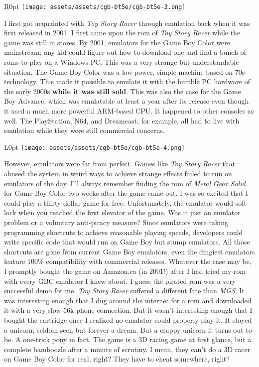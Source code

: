 \documentclass{book}
\begin{document}
\begin{wrapfigure}{R}{0pt} \texttt{[image: assets/assets/cgb-bt5e/cgb-bt5e-3.png]}\end{wrapfigure}
I first got acquainted with \emph{Toy Story Racer} through emulation back when it was first released in 2001. I first came upon the rom of \emph{Toy Story Racer} while the game was still in stores. By 2001, emulators for the Game Boy Color were mainstream; any kid could figure out how to download one and find a bunch of roms to play on a Windows PC. This was a very strange but understandable situation. The Game Boy Color was a low-power, simple machine based on 70s technology. This made it possible to emulate it with the humble PC hardware of the early 2000s \textbf{while it was still sold}. This was also the case for the Game Boy Advance, which was emulatable at least a year after its release even though it used a much more powerful ARM-based CPU. It happened to other consoles as well. The PlayStation, N64, and Dreamcast, for example, all had to live with emulation while they were still commercial concerns.

\begin{wrapfigure}{L}{0pt} \texttt{[image: assets/assets/cgb-bt5e/cgb-bt5e-4.png]}\end{wrapfigure}
However, emulators were far from perfect. Games like \emph{Toy Story Racer} that abused the system in weird ways to achieve strange effects failed to run on emulators of the day. I’ll always remember finding the rom of \emph{Metal Gear Solid} for Game Boy Color two weeks after the game came out. I was so excited that I could play a thirty-dollar game for free. Unfortunately, the emulator would soft-lock when you reached the first elevator of the game. Was it just an emulator problem or a voluntary anti-piracy measure? Since emulators were taking programming shortcuts to achieve reasonable playing speeds, developers could write specific code that would run on Game Boy but stump emulators. All those shortcuts are gone from current Game Boy emulators; even the dingiest emulators feature 100\% compatibility with commercial releases. Whatever the case may be, I promptly bought the game on Amazon.ca (in 2001!) after I had tried my rom with every GBC emulator I knew about. I guess the pirated rom was a very successful demo for me. \emph{Toy Story Racer} suffered a different fate than \emph{MGS}. It was interesting enough that I dug around the internet for a rom and downloaded it with a very slow 56k phone connection. But it wasn’t interesting enough that I bought the cartridge once I realized no emulator could properly play it. It stayed a unicorn; seldom seen but forever a dream. But a crappy unicorn it turns out to be. A one-trick pony in fact. The game is a 3D racing game at first glance, but a complete bamboozle after a minute of scrutiny. I mean, they can’t do a 3D racer on Game Boy Color for real, right? They have to cheat somewhere, right?
\end{document}

